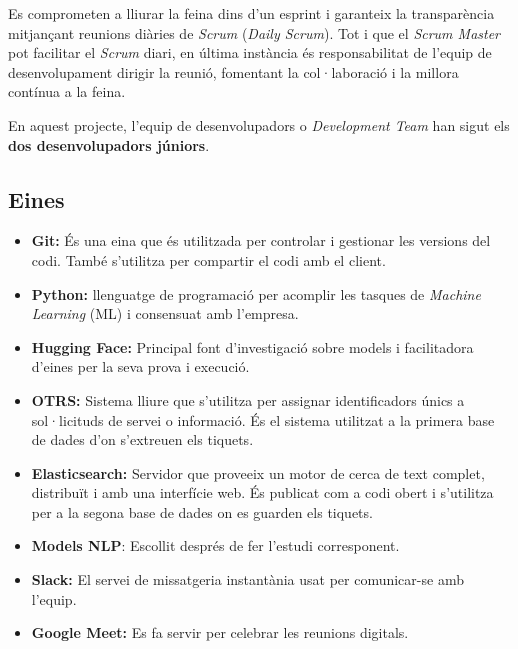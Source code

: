 Es comprometen a lliurar la feina dins d'un esprint i garanteix la transparència mitjançant reunions diàries de \textit{Scrum} (\textit{Daily Scrum}). Tot i que el \textit{Scrum Master} pot facilitar el \textit{Scrum} diari, en última instància és responsabilitat de l'equip de desenvolupament dirigir la reunió, fomentant la col·laboració i la millora contínua a la feina.

En aquest projecte, l'equip de desenvolupadors o \textit{Development Team} han sigut els \textbf{dos desenvolupadors júniors}.






\subsection{Eines}

\begin{itemize}
    \item \textbf{Git:} És una eina que és utilitzada per controlar i gestionar les versions del codi. També s'utilitza per compartir el codi amb el client.
    \item \textbf{Python:} llenguatge de programació per acomplir les tasques de \textit{Machine Learning} (ML) i consensuat amb l'empresa.
    \item \textbf{Hugging Face:} Principal font d'investigació sobre models i facilitadora d'eines per la seva prova i execució.
    \item \textbf{OTRS:} Sistema lliure que s'utilitza per assignar identificadors únics a sol·licituds de servei o informació. És el sistema utilitzat a la primera base de dades d'on s'extreuen els tiquets.
    \item \textbf{Elasticsearch:} Servidor que proveeix un motor de cerca de text complet, distribuït i amb una interfície web. És publicat com a codi obert i s'utilitza per a la segona base de dades on es guarden els tiquets.
    \item \textbf{Models NLP\cite{Hugging-Face}}: Escollit després de fer l'estudi corresponent.
    \item \textbf{Slack:} El servei de missatgeria instantània usat per comunicar-se amb l'equip.
    \item \textbf{Google Meet:} Es fa servir per celebrar les reunions digitals.
\end{itemize}